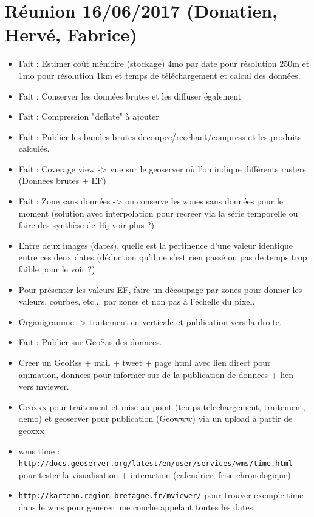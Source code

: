 \documentclass[10pt,a4paper]{article}
\begin{document}
\section{Réunion 16/06/2017 (Donatien, Hervé, Fabrice)}
\begin{itemize}
\item Fait : Estimer coût mémoire (stockage) 4mo par date pour résolution 250m et 1mo pour résolution 1km et temps de téléchargement et calcul des données.
\item Fait : Conserver les données brutes et les diffuser également
\item Fait : Compression "deflate" à ajouter
\item Fait : Publier les bandes brutes decoupee/reechant/compress et les produits calculés.
\item Fait : Coverage view -> vue sur le geoserver où l'on indique différents rasters (Donnees brutes + EF)
\item Fait : Zone sans données -> on conserve les zones sans données pour le moment (solution avec interpolation pour recréer via la série temporelle ou faire des synthèse de 16j voir plus ?)
\item Entre deux images (dates), quelle est la pertinence d'une valeur identique entre ces deux dates (déduction qu'il ne s'est rien passé ou pas de temps trop faible pour le voir ?)
\item Pour présenter les valeurs EF, faire un découpage par zones pour donner les valeurs, courbes, etc... par zones et non pas à l'échelle du pixel.
\item Organigramme -> traitement en verticale et publication vers la droite.
\item Fait : Publier sur GeoSas des donnees.
\item Creer un GeoRss + mail + tweet + page html avec lien direct pour animation, donnees pour informer sur de la publication de donnees + lien vers mviewer.
\item Geoxxx pour traitement et mise au point (temps telechargement, traitement, demo) et geoserver pour publication (Geowww) via un upload à partir de geoxxx
\item wms time : \newline \verb!http://docs.geoserver.org/latest/en/user/services/wms/time.html! pour tester la visualisation + interaction (calendrier, frise chronologique)
\item \verb!http://kartenn.region-bretagne.fr/mviewer/! pour trouver exemple time dans le wms pour generer une couche appelant toutes les dates.

\end{itemize}
\end{document}
